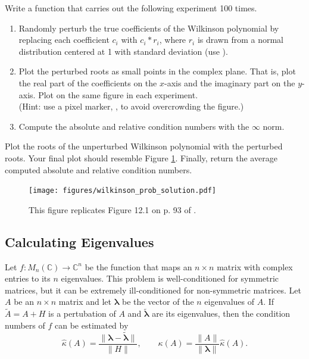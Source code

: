 \begin{problem}
Write a function that carries out the following experiment 100 times.
\begin{enumerate}
\item Randomly perturb the true coefficients of the Wilkinson polynomial by replacing each coefficient $c_i$ with $c_i*r_i$, where $r_i$ is drawn from a normal distribution centered at 1 with standard deviation  (use ).
\item Plot the perturbed roots as small points in the complex plane.
That is, plot the real part of the coefficients on the $x$-axis and the imaginary part on the $y$-axis.
Plot on the same figure in each experiment.
\\(Hint: use a pixel marker, , to avoid overcrowding the figure.)
\item Compute the absolute and relative condition numbers with the $\infty$ norm.
\end{enumerate}
Plot the roots of the unperturbed Wilkinson polynomial with the perturbed roots.
Your final plot should resemble Figure \ref{fig:wilkinsonpolynomial_many}.
Finally, return the average computed absolute and relative condition numbers.

\begin{figure}[H]
\texttt{[image: figures/wilkinson\_prob\_solution.pdf]}
\caption{
This figure replicates Figure 12.1 on p. 93 of \cite{Trefethen1997}.}
\label{fig:wilkinsonpolynomial_many}
\end{figure}

\label{prob:wilkinson-polynomial-roots}
\end{problem}

\subsection*{Calculating Eigenvalues} %

Let $f:M_n(\mathbb{C}) \rightarrow \mathbb{C}^n$ be the function that maps an $n \times n$ matrix with complex entries to its $n$ eigenvalues.
This problem is well-conditioned for symmetric matrices, but it can be extremely ill-conditioned for non-symmetric matrices.
Let $A$ be an $n\times n$ matrix and let $\boldsymbol{\lambda}$ be the vector of the $n$ eigenvalues of $A$.
If $\tilde{A} = A + H$ is a pertubation of $A$ and $\tilde{\boldsymbol{\lambda}}$ are its eigenvalues, then the condition numbers of $f$ can be estimated by
\begin{equation}
\hat{\kappa}(A) = \frac{\|\boldsymbol{\lambda} - \tilde{\boldsymbol{\lambda}}\|}{\|H\|},
\qquad
\kappa(A) = \frac{\|A\|}{\|\boldsymbol{\lambda}\|}\hat{\kappa}(A).
\label{eq:eig-condition-numbers}
\end{equation}

